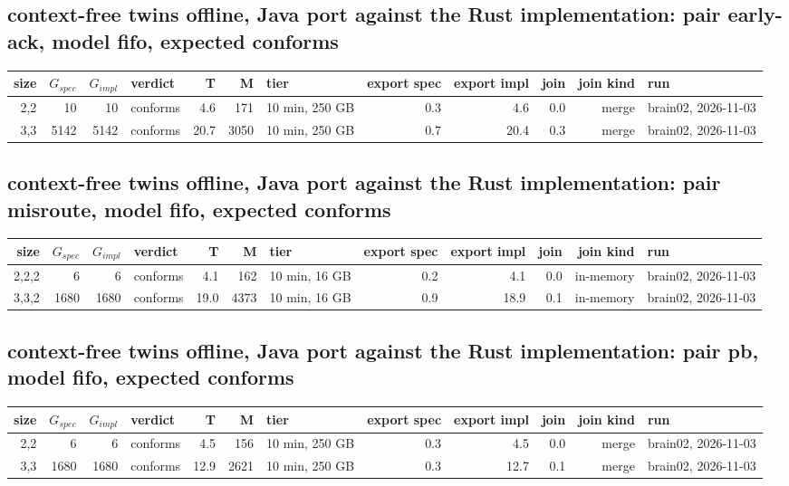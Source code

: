 \documentclass[10pt]{article}
\begin{document}
\subsection*{context-free twins offline, Java port against the Rust implementation: pair \textsf{early-ack}, model fifo, expected conforms}
\begin{longtable}{@{}rrrlrrlrrrrl@{}}
\toprule
size & $G_{\mathit{spec}}$ & $G_{\mathit{impl}}$ & verdict & T & M & tier & export spec & export impl & join & join kind & run \\
\midrule
\endhead
\color{blue} 2,2 & 10 & 10 & conforms & 4.6 & 171 & 10 min, 250 GB & 0.3 & 4.6 & 0.0 & merge & brain02, 2026-11-03 \\
\color{blue} 3,3 & 5142 & 5142 & conforms & 20.7 & 3050 & 10 min, 250 GB & 0.7 & 20.4 & 0.3 & merge & brain02, 2026-11-03 \\
\bottomrule
\end{longtable}
\subsection*{context-free twins offline, Java port against the Rust implementation: pair \textsf{misroute}, model fifo, expected conforms}
\begin{longtable}{@{}rrrlrrlrrrrl@{}}
\toprule
size & $G_{\mathit{spec}}$ & $G_{\mathit{impl}}$ & verdict & T & M & tier & export spec & export impl & join & join kind & run \\
\midrule
\endhead
\color{red} 2,2,2 & 6 & 6 & conforms & 4.1 & 162 & 10 min, 16 GB & 0.2 & 4.1 & 0.0 & in-memory & brain02, 2026-11-03 \\
\color{red} 3,3,2 & 1680 & 1680 & conforms & 19.0 & 4373 & 10 min, 16 GB & 0.9 & 18.9 & 0.1 & in-memory & brain02, 2026-11-03 \\
\bottomrule
\end{longtable}
\subsection*{context-free twins offline, Java port against the Rust implementation: pair \textsf{pb}, model fifo, expected conforms}
\begin{longtable}{@{}rrrlrrlrrrrl@{}}
\toprule
size & $G_{\mathit{spec}}$ & $G_{\mathit{impl}}$ & verdict & T & M & tier & export spec & export impl & join & join kind & run \\
\midrule
\endhead
\color{blue} 2,2 & 6 & 6 & conforms & 4.5 & 156 & 10 min, 250 GB & 0.3 & 4.5 & 0.0 & merge & brain02, 2026-11-03 \\
\color{blue} 3,3 & 1680 & 1680 & conforms & 12.9 & 2621 & 10 min, 250 GB & 0.3 & 12.7 & 0.1 & merge & brain02, 2026-11-03 \\
\bottomrule
\end{longtable}
\end{document}

